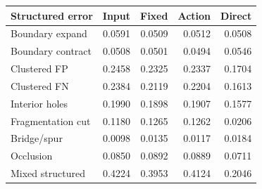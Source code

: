 \begingroup\scriptsize
\renewcommand{\arraystretch}{1.10}
\begin{center}
\begin{tabular}{lrrrr}
\toprule
Structured error & Input & Fixed & Action & Direct\\
\midrule
Boundary expand & 0.0591 & 0.0509 & 0.0512 & 0.0508\\
Boundary contract & 0.0508 & 0.0501 & 0.0494 & 0.0546\\
Clustered FP & 0.2458 & 0.2325 & 0.2337 & 0.1704\\
Clustered FN & 0.2384 & 0.2119 & 0.2204 & 0.1613\\
Interior holes & 0.1990 & 0.1898 & 0.1907 & 0.1577\\
Fragmentation cut & 0.1180 & 0.1265 & 0.1262 & 0.0206\\
Bridge/spur & 0.0098 & 0.0135 & 0.0117 & 0.0184\\
Occlusion & 0.0850 & 0.0892 & 0.0889 & 0.0711\\
Mixed structured & 0.4224 & 0.3953 & 0.4124 & 0.2046\\
\bottomrule
\end{tabular}
\end{center}
\endgroup
{}
